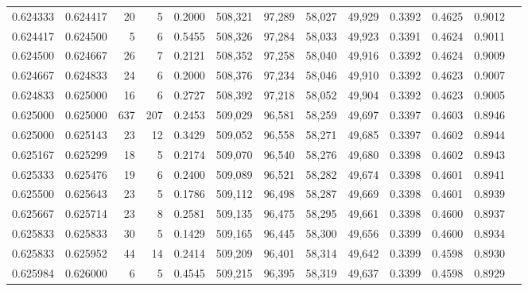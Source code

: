 \begin{tabular}{rrrrrrrrrrrrr}
0.624333 & 0.624417 &    20 &   5 &                                     0.2000 & 508,321 &  97,289 &  58,027 &  49,929 & 0.3392 & 0.4625 & 0.9012 \\
0.624417 & 0.624500 &     5 &   6 &                                     0.5455 & 508,326 &  97,284 &  58,033 &  49,923 & 0.3391 & 0.4624 & 0.9011 \\
0.624500 & 0.624667 &    26 &   7 &                                     0.2121 & 508,352 &  97,258 &  58,040 &  49,916 & 0.3392 & 0.4624 & 0.9009 \\
0.624667 & 0.624833 &    24 &   6 &                                     0.2000 & 508,376 &  97,234 &  58,046 &  49,910 & 0.3392 & 0.4623 & 0.9007 \\
0.624833 & 0.625000 &    16 &   6 &                                     0.2727 & 508,392 &  97,218 &  58,052 &  49,904 & 0.3392 & 0.4623 & 0.9005 \\
0.625000 & 0.625000 &   637 & 207 &                                     0.2453 & 509,029 &  96,581 &  58,259 &  49,697 & 0.3397 & 0.4603 & 0.8946 \\
0.625000 & 0.625143 &    23 &  12 &                                     0.3429 & 509,052 &  96,558 &  58,271 &  49,685 & 0.3397 & 0.4602 & 0.8944 \\
0.625167 & 0.625299 &    18 &   5 &                                     0.2174 & 509,070 &  96,540 &  58,276 &  49,680 & 0.3398 & 0.4602 & 0.8943 \\
0.625333 & 0.625476 &    19 &   6 &                                     0.2400 & 509,089 &  96,521 &  58,282 &  49,674 & 0.3398 & 0.4601 & 0.8941 \\
0.625500 & 0.625643 &    23 &   5 &                                     0.1786 & 509,112 &  96,498 &  58,287 &  49,669 & 0.3398 & 0.4601 & 0.8939 \\
0.625667 & 0.625714 &    23 &   8 &                                     0.2581 & 509,135 &  96,475 &  58,295 &  49,661 & 0.3398 & 0.4600 & 0.8937 \\
0.625833 & 0.625833 &    30 &   5 &                                     0.1429 & 509,165 &  96,445 &  58,300 &  49,656 & 0.3399 & 0.4600 & 0.8934 \\
0.625833 & 0.625952 &    44 &  14 &                                     0.2414 & 509,209 &  96,401 &  58,314 &  49,642 & 0.3399 & 0.4598 & 0.8930 \\
0.625984 & 0.626000 &     6 &   5 &                                     0.4545 & 509,215 &  96,395 &  58,319 &  49,637 & 0.3399 & 0.4598 & 0.8929 \\

\end{tabular}
